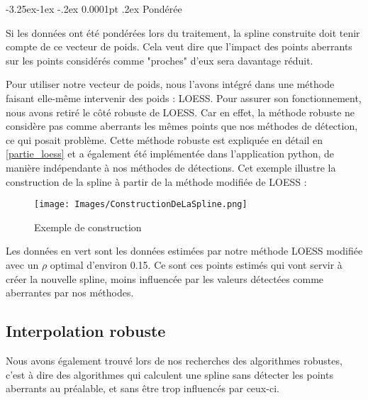 \documentclass[a4paper,12pt]{article} %
\makeatletter
\renewcommand\paragraph{\@startsection{paragraph}{4}{\z@}%
                                      {-3.25ex\@plus -1ex \@minus -.2ex}%
                                      {0.0001pt \@plus .2ex}%
                                      {\normalfont\normalsize\bfseries}}
\makeatother
\begin{document}
			        \paragraph{Pondérée}
			        
    			        Si les données ont été pondérées lors du traitement, la spline construite doit tenir compte de ce vecteur de poids. Cela veut dire que l'impact des points aberrants sur les points considérés comme "proches" d'eux sera davantage réduit.
                        
                        Pour utiliser notre vecteur de poids, nous l'avons intégré dans une méthode faisant elle-même intervenir des poids : LOESS. Pour assurer son fonctionnement, nous avons retiré le côté robuste de LOESS. Car en effet, la méthode robuste ne considère pas comme aberrants les mêmes points que nos méthodes de détection, ce qui posait problème. Cette méthode robuste est expliquée en détail en \ref{partie_loess} et a également été implémentée dans l'application python, de manière indépendante à nos méthodes de détections.
					    Cet exemple illustre la construction de la spline à partir de la méthode modifiée de LOESS :
					   
    			        \begin{figure}[H]
                            \centering
                            \texttt{[image: Images/ConstructionDeLaSpline.png]}
                            \caption{Exemple de construction}
                            \label{fig:exemple}
                        \end{figure}
                        
                       Les données en vert sont les données estimées par notre méthode LOESS modifiée avec un $\rho $ optimal d'environ 0.15.  Ce sont ces points estimés qui vont servir à créer la nouvelle spline, moins influencée par les valeurs détectées comme aberrantes par nos méthodes.
                
					    
			\subsection{Interpolation robuste}
        		
        		Nous avons également trouvé lors de nos recherches des algorithmes robustes, c'est à dire des algorithmes qui calculent une spline sans détecter les points aberrants au préalable, et sans être trop influencés par ceux-ci.
        		
\end{document}

